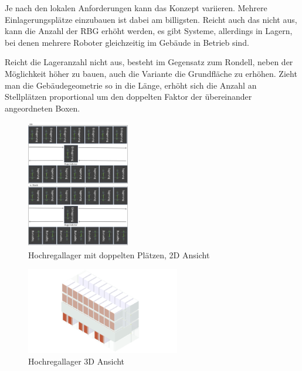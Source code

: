 \clearpage

Je nach den lokalen Anforderungen kann das Konzept variieren. Mehrere Einlagerungsplätze einzubauen ist dabei am billigsten. Reicht auch das nicht aus, kann die Anzahl der \ac{RBG} erhöht werden, es gibt Systeme, allerdings in Lagern, bei denen mehrere Roboter gleichzeitig im Gebäude in Betrieb sind.

\indent Reicht die Lageranzahl nicht aus, besteht im Gegensatz zum Rondell, neben der Möglichkeit höher zu bauen, auch die Variante die Grundfläche zu erhöhen. Zieht man die Gebäudegeometrie so in die Länge, erhöht sich die Anzahl an Stellplätzen proportional um den doppelten Faktor der übereinander angeordneten Boxen.

\begin{figure}[H]
    \centering
    \includegraphics[width=0.4\textwidth]{images/hochregallager2ddoppelt.jpg}
    \caption{Hochregallager mit doppelten Plätzen, 2D Ansicht}
    \label{fig:hochregallager2ddoppelt}
\end{figure}

\begin{figure}[H]
    \centering
    \includegraphics[width=0.6\textwidth]{images/hochregallager3d.png}
    \caption{Hochregallager 3D Ansicht}
    \label{fig:hochregallager3d}
\end{figure}

